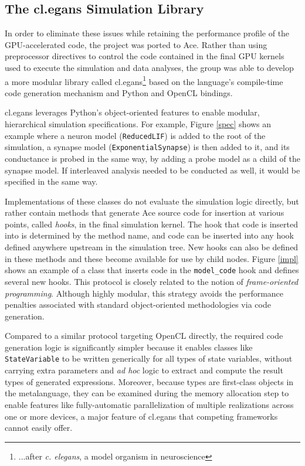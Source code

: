 \documentclass{sig-alternate}
\begin{document}
\subsection{The {\sf cl.egans} Simulation Library}
In order to eliminate these issues while retaining the performance profile of the GPU-accelerated code, the project was ported to Ace. Rather than using preprocessor directives to control the code contained in the final GPU kernels used to execute the simulation and data analyses, the group was able to develop a more modular  library called {\sf cl.egans}\footnote{...after {\it c. elegans}, a model organism in neuroscience} based on the language's compile-time code generation mechanism and Python and OpenCL bindings.

{\sf cl.egans} leverages Python's object-oriented features to enable modular, hierarchical simulation specifications. For example, Figure \ref{spec} shows an example where a neuron model (\verb|ReducedLIF|) is added to the root of the simulation, a synapse model (\verb|ExponentialSynapse|) is then added to it, and its conductance is probed in the same way, by adding a probe model as a child of the synapse model. If interleaved analysis needed to be conducted as well, it would be specified in the same way.

Implementations of these classes do not evaluate the simulation logic directly, but rather contain methods that generate Ace source code for insertion at various points, called {\it hooks}, in the final simulation kernel. The hook that code is inserted into is determined by the method name, and code can be inserted into any hook defined anywhere upstream in the simulation tree. New hooks can also be defined in these methods and these become available for use by child nodes. Figure \ref{impl} shows an example of a class that inserts code in the \verb|model_code| hook and defines several new hooks. This protocol is closely related to the notion of {\it frame-oriented programming}. Although highly modular, this strategy avoids the performance penalties associated with standard object-oriented methodologies via code generation.

Compared to a similar protocol targeting OpenCL directly, the required code generation logic is significantly simpler because it enables classes like \verb|StateVariable| to be written generically for all types of state variables, without carrying extra parameters and {\it ad hoc} logic to extract and compute the result types of generated expressions. Moreover, because types are first-class objects in the metalanguage, they can be examined during the memory allocation step to enable features like fully-automatic parallelization of multiple realizations across one or more devices, a major feature of {\sf cl.egans} that competing frameworks cannot easily offer.
\end{document}
